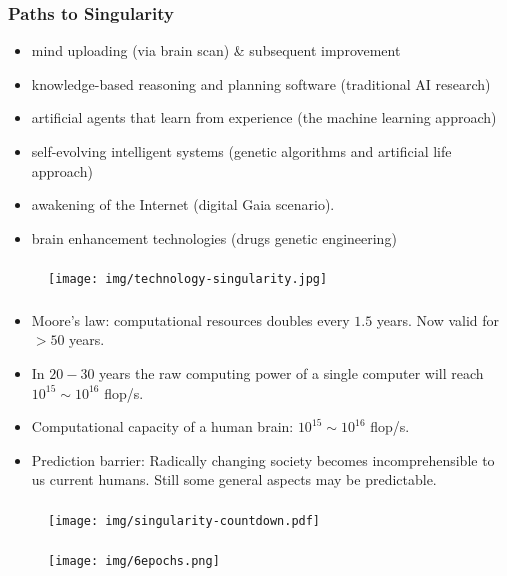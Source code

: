\documentclass[UTF8,11pt,colorlinks,compress,openany]{beamer}%
\begin{document}
\begin{frame}\frametitle{Paths to Singularity}
\begin{itemize}
	\item mind uploading (via brain scan) \& subsequent improvement
	\item knowledge-based reasoning and planning software (traditional AI research)
	\item artificial agents that learn from experience (the machine learning approach)
	\item self-evolving intelligent systems (genetic algorithms and artificial life approach)
	\item awakening of the Internet (digital Gaia scenario).
	\item brain enhancement technologies (drugs genetic engineering) 
\end{itemize}	
\end{frame}

\begin{frame}\frametitle{}
\begin{figure}[H]
\texttt{[image: img/technology-singularity.jpg]}	
\end{figure}
\end{frame}

\begin{frame}\frametitle{}
\begin{itemize}
	\item Moore's law: computational resources doubles every $1.5$ years. Now valid for $>50$ years.
	\item In $20-30$ years the raw computing power of a single computer will reach $10^{15}\sim 10^{16}$ flop/s.
	\item Computational capacity of a human brain: $10^{15}\sim 10^{16}$ flop/s.
	\item Prediction barrier: Radically changing society becomes incomprehensible to us current humans. Still some general aspects may be predictable.
\end{itemize}
\end{frame}

\begin{frame}\frametitle{}
\begin{figure}[H]
\texttt{[image: img/singularity-countdown.pdf]}	
\end{figure}
\end{frame}

\begin{frame}\frametitle{}
\begin{figure}[H]
\texttt{[image: img/6epochs.png]}	
\end{figure}
\end{frame}
\end{document}
